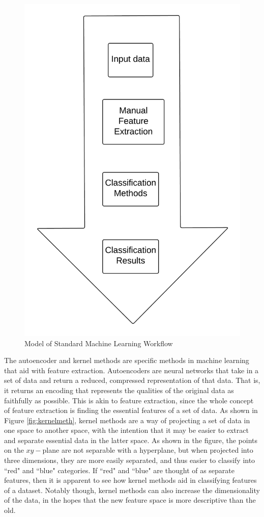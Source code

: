\documentclass{sig-alternate}
\begin{document}
\begin{figure}[h]
	\begin{center}
		\includegraphics[width=0.75\linewidth]{mlworkflow}
	\end{center}
	\vspace{-12pt}
	\caption{Model of Standard Machine Learning Workflow}
	\label{fig:mlworkflow}
\end{figure}

The autoencoder and kernel methods are specific methods in machine learning that aid with feature
extraction. Autoencoders are neural networks that take in a set of data and return a reduced, 
compressed representation of that data. That is, it returns an encoding that represents the qualities of
the original data as faithfully as possible. This is akin to feature 
extraction, since the whole concept of feature extraction is finding the essential features 
of a set of data. As shown in Figure \ref{fig:kernelmeth}, kernel methods are a way of projecting
a set of data in one space to another space, with the intention that it may
be easier to extract and separate essential data in the latter space. As shown in the figure, the
points on the $xy-$plane are not separable with a hyperplane, but when projected into three 
dimensions, they are more easily separated, and thus easier to classify into ``red" and ``blue" 
categories. If ``red" and ``blue" are thought of as separate features, then it is apparent to see
how kernel methods aid in classifying features of a dataset. Notably though, kernel methods can
also increase the dimensionality of the data, in the hopes that the new feature space is more 
descriptive than the old. 
\end{document}
